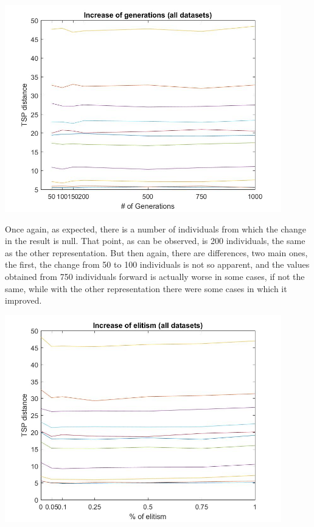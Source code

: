 \begin{center}
\includegraphics[width=12cm]{img/order_crossover/numberGens.jpg}
\end{center}

Once again, as expected, there is a number of individuals from which the
change in the result is null. That point, as can be observed, is 200
individuals, the same as the other representation. But then again, there
are differences, two main ones, the first, the change from 50 to 100
individuals is not so apparent, and the values obtained from 750
individuals forward is actually worse in some cases, if not the same, while
with the other representation there were some cases in which it
improved.

\begin{center}
\includegraphics[width=12cm]{img/order_crossover/elitism.jpg}
\end{center}

